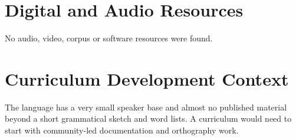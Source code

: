 \documentclass[12pt]{article}
\begin{document}
\section{Digital and Audio Resources}
No audio, video, corpus or software resources were found.

\section{Curriculum Development Context}
The language has a very small speaker base and almost no published material beyond a short grammatical sketch and word lists. A curriculum would need to start with community-led documentation and orthography work.
\end{document}
